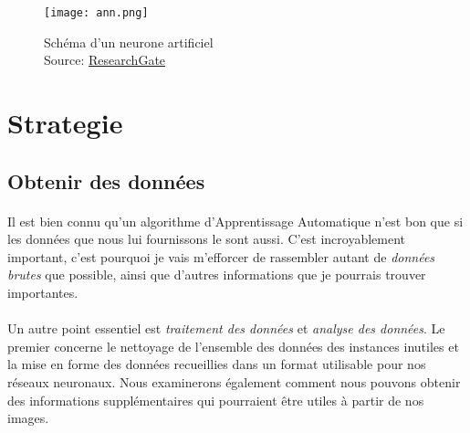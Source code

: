 \begin{figure}[h]
    \centering
    \texttt{[image: ann.png]}
    \caption{Schéma d'un neurone artificiel\\Source: \href{https://www.researchgate.net/figure/Deep-learning-diagram_fig5_323784695}{ResearchGate}}
\end{figure}

\section{Strategie}

\subsection{Obtenir des données}
\paragraph{}
Il est bien connu qu'un algorithme d'Apprentissage Automatique n'est bon que si les données que nous lui fournissons le sont aussi.
C'est incroyablement important, c'est pourquoi je vais m'efforcer de rassembler autant de \emph{données brutes} que possible, ainsi que d'autres informations que je pourrais trouver importantes.

\paragraph{}
Un autre point essentiel est \emph{traitement des données} et \emph{analyse des données}.
Le premier concerne le nettoyage de l'ensemble des données des instances inutiles et la mise en forme des données recueillies dans un format utilisable pour nos réseaux neuronaux.
Nous examinerons également comment nous pouvons obtenir des informations supplémentaires qui pourraient être utiles à partir de nos images.


